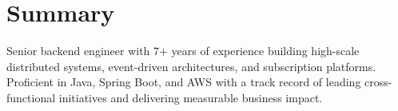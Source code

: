 \section{Summary}\label{sec:summary}
\startListPointOneInchAwayFromLeft
    \vspace{4pt}
    \item{%
        \small{%
            Senior backend engineer with 7+ years of experience building high-scale distributed systems, event-driven architectures, and subscription platforms. Proficient in Java, Spring Boot, and AWS with a track record of leading cross-functional initiatives and delivering measurable business impact.%
        }%
    }
\makeLinePointOneInchAwayEnd

